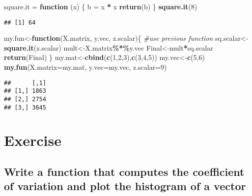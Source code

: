 \documentclass[
]{article}
\newenvironment{Shaded}{\begin{snugshade}}{\end{snugshade}}
\newcommand{\AttributeTok}[1]{\textcolor[rgb]{0.13,0.29,0.53}{#1}}
\newcommand{\CommentTok}[1]{\textcolor[rgb]{0.56,0.35,0.01}{\textit{#1}}}
\newcommand{\ControlFlowTok}[1]{\textcolor[rgb]{0.13,0.29,0.53}{\textbf{#1}}}
\newcommand{\DecValTok}[1]{\textcolor[rgb]{0.00,0.00,0.81}{#1}}
\newcommand{\FunctionTok}[1]{\textcolor[rgb]{0.13,0.29,0.53}{\textbf{#1}}}
\newcommand{\NormalTok}[1]{#1}
\newcommand{\OtherTok}[1]{\textcolor[rgb]{0.56,0.35,0.01}{#1}}
\newcommand{\SpecialCharTok}[1]{\textcolor[rgb]{0.81,0.36,0.00}{\textbf{#1}}}
\begin{document}
\begin{Shaded}
\begin{Highlighting}[]
\NormalTok{square.it }\OtherTok{=} \ControlFlowTok{function}\NormalTok{ (x) \{}
\NormalTok{  b }\OtherTok{=}\NormalTok{ x }\SpecialCharTok{*}\NormalTok{ x}
  \FunctionTok{return}\NormalTok{(b)}
\NormalTok{\}}
\FunctionTok{square.it}\NormalTok{(}\DecValTok{8}\NormalTok{)}
\end{Highlighting}
\end{Shaded}

\begin{verbatim}
## [1] 64
\end{verbatim}

\begin{Shaded}
\begin{Highlighting}[]
\NormalTok{my.fun}\OtherTok{\textless{}{-}}\ControlFlowTok{function}\NormalTok{(X.matrix, y.vec, z.scalar)\{}
 \CommentTok{\#use previous function}
\NormalTok{ sq.scalar}\OtherTok{\textless{}{-}}\FunctionTok{square.it}\NormalTok{(z.scalar)}
\NormalTok{ mult}\OtherTok{\textless{}{-}}\NormalTok{X.matrix}\SpecialCharTok{\%*\%}\NormalTok{y.vec}
\NormalTok{ Final}\OtherTok{\textless{}{-}}\NormalTok{mult}\SpecialCharTok{*}\NormalTok{sq.scalar}
 \FunctionTok{return}\NormalTok{(Final)}
\NormalTok{ \}}
\NormalTok{ my.mat}\OtherTok{\textless{}{-}}\FunctionTok{cbind}\NormalTok{(}\FunctionTok{c}\NormalTok{(}\DecValTok{1}\NormalTok{,}\DecValTok{2}\NormalTok{,}\DecValTok{3}\NormalTok{),}\FunctionTok{c}\NormalTok{(}\DecValTok{3}\NormalTok{,}\DecValTok{4}\NormalTok{,}\DecValTok{5}\NormalTok{))}
\NormalTok{ my.vec}\OtherTok{\textless{}{-}}\FunctionTok{c}\NormalTok{(}\DecValTok{5}\NormalTok{,}\DecValTok{6}\NormalTok{)}
 \FunctionTok{my.fun}\NormalTok{(}\AttributeTok{X.matrix=}\NormalTok{my.mat, }\AttributeTok{y.vec=}\NormalTok{my.vec, }\AttributeTok{z.scalar=}\DecValTok{9}\NormalTok{)}
\end{Highlighting}
\end{Shaded}

\begin{verbatim}
##      [,1]
## [1,] 1863
## [2,] 2754
## [3,] 3645
\end{verbatim}

\section{Exercise}\label{exercise}

\subsection{Write a function that computes the coefficient of variation
and plot the histogram of a
vector}\label{write-a-function-that-computes-the-coefficient-of-variation-and-plot-the-histogram-of-a-vector}
\end{document}
